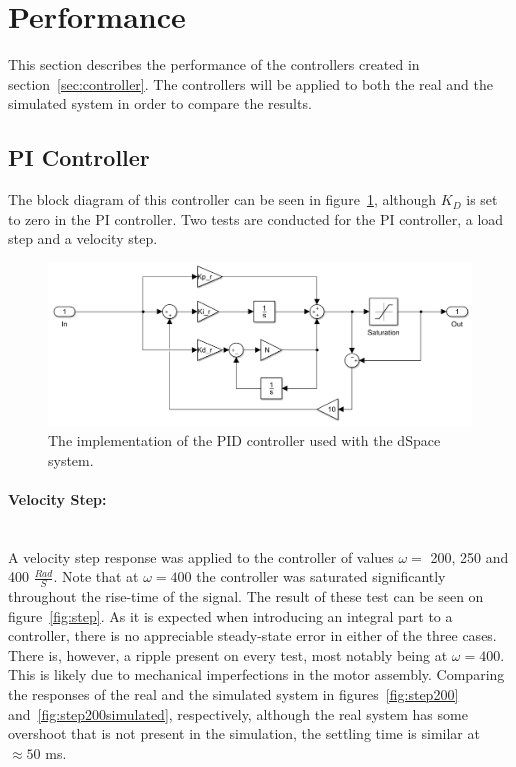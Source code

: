 \clearpage
\section{Performance}
This section describes the performance of the controllers created in section~\ref{sec:controller}.
The controllers will be applied to both the real and the simulated system in order to compare the results.

\subsection{PI Controller}
The block diagram of this controller can be seen in figure~\ref{fig:pidcontroller}, although $K_D$ is set to zero in the PI controller.
Two tests are conducted for the PI controller, a load step and a velocity step.

\begin{figure}[!h]
	\centering
	\includegraphics[width=.75\linewidth]{graphics/pid_controller}
	\caption{The implementation of the PID controller used with the dSpace system.}
	\label{fig:pidcontroller}
\end{figure}

\paragraph{Velocity Step:}~\\
A velocity step response was applied to the controller of values $\omega =$ 200, 250 and 400 $\frac{Rad}{S}$.
Note that at $\omega=400$ the controller was saturated significantly throughout the rise-time of the signal.
The result of these test can be seen on figure~\ref{fig:step}.
As it is expected when introducing an integral part to a controller, there is no appreciable steady-state error in either of the three cases.
There is, however, a ripple present on every test, most notably being at $\omega = 400$.
This is likely due to mechanical imperfections in the motor assembly.
Comparing the responses of the real and the simulated system in figures~\ref{fig:step200} and~\ref{fig:step200simulated}, respectively, although the real system has some overshoot that is not present in the simulation, the settling time is similar at $\approx50$ ms.

